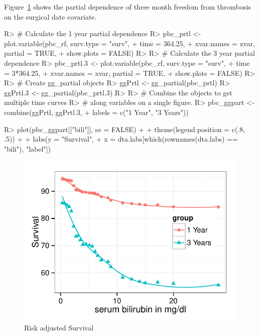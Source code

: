 \documentclass[nojss]{jss}\usepackage[]{graphicx}\usepackage[]{color}
\makeatletter
\def\maxwidth{ %
  \ifdim\Gin@nat@width>\linewidth
    \linewidth
  \else
    \Gin@nat@width
  \fi
}
\makeatother
\begin{document}
Figure~\ref{fig:pbc-partial-bili} shows the partial dependence of three month freedom from thrombosis on the surgical date covariate. 

\begin{Schunk}
\begin{Sinput}
R> # Calculate the 1 year partial dependence
R> pbc_prtl <- plot.variable(pbc_rf, surv.type = "surv", 
+              time = 364.25, 
+            xvar.names = xvar, partial = TRUE, 
+            show.plots = FALSE)
R> 
R> # Calculate the 3 year partial dependence
R> pbc_prtl.3 <- plot.variable(pbc_rf, surv.type = "surv", 
+               time = 3*364.25, 
+            xvar.names = xvar, partial = TRUE, 
+            show.plots = FALSE)
R> 
R> # Create gg_partial objects
R> ggPrtl <- gg_partial(pbc_prtl)
R> ggPrtl.3 <- gg_partial(pbc_prtl.3)
R> 
R> # Combine the objects to get multiple time curves 
R> # along variables on a single figure.
R> pbc_ggpart <- combine(ggPrtl, ggPrtl.3, 
+            labels = c("1 Year", "3 Years"))
\end{Sinput}
\end{Schunk}




\begin{Schunk}
\begin{Sinput}
R> plot(pbc_ggpart[["bili"]], se = FALSE) + 
+  theme(legend.position = c(.8, .5)) + 
+  labs(y = "Survival", 
+     x = dta.labs[which(rownames(dta.labs) ==  "bili"), "label"])
\end{Sinput}
\begin{figure}[!htpb]

{\centering \includegraphics[width=\maxwidth]{figure/rfs-pbc-partial-bili-1} 

}

\caption[Risk adjusted Survival]{Risk adjusted Survival\label{fig:pbc-partial-bili}}
\end{figure}
\end{Schunk}
\end{document}
